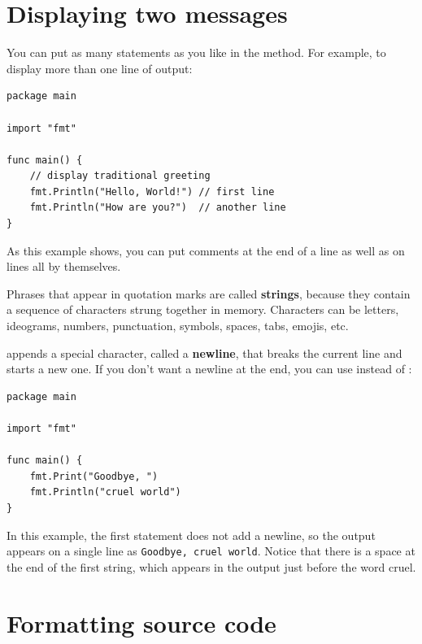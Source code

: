 \section{Displaying two messages}

You can put as many statements as you like in the  method.
For example, to display more than one line of output:

\begin{lstlisting}
package main

import "fmt"

func main() {
	// display traditional greeting
	fmt.Println("Hello, World!") // first line
	fmt.Println("How are you?")  // another line
}
\end{lstlisting}

As this example shows, you can put comments at the end of a line as well as on lines all by themselves.


Phrases that appear in quotation marks are called {\bf strings}, because they contain a sequence of characters strung together in memory.
Characters can be letters, ideograms, numbers, punctuation, symbols, spaces, tabs, emojis, etc.


 appends a special character, called a {\bf newline}, that breaks the current line and starts a new one.
If you don't want a newline at the end, you can use  instead of :

\begin{lstlisting}
package main

import "fmt"

func main() {
	fmt.Print("Goodbye, ")
	fmt.Println("cruel world")
}
\end{lstlisting}

\label{goodbye}

In this example, the first statement does not add a newline, so the output appears on a single line as {\tt Goodbye, cruel world}.
Notice that there is a space at the end of the first string, which appears in the output just before the word cruel.


\section{Formatting source code}
\label{formatting}

